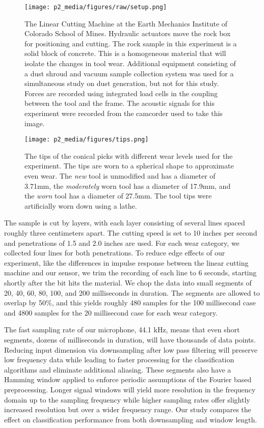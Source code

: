 \begin{figure}[t!]
\centering
\texttt{[image: p2\_media/figures/raw/setup.png]}
\caption{The Linear Cutting Machine at the Earth Mechanics Institute of Colorado School of Mines.
Hydraulic actuators move the rock box for positioning and cutting. The rock sample in this experiment
is a solid block of concrete. This is a homogeneous material that will isolate the changes in tool wear.
Additional equipment consisting of a dust shroud and vacuum sample collection system was used for a
 simultaneous study on dust generation, but not for this study.
Forces are recorded using integrated load cells in the coupling between the tool and the frame.
The acoustic signals for this experiment were recorded from the camcorder used to take this image.
}
\label{fig:setup}
\end{figure}

\begin{figure}[t!]
\centering
\texttt{[image: p2\_media/figures/tips.png]}
\caption{The tips of the conical picks with different wear levels used for the experiment.
The tips are worn to a spherical shape to approximate even wear. The \textit{new} tool is unmodified
and has a diameter of 3.71mm, the \textit{moderately} worn tool has a diameter of 17.9mm,
 and the \textit{worn} tool has a diameter of 27.5mm. The tool tips were artificially worn down using a lathe.}
\label{fig:levels}
\end{figure}

The sample is cut by layers, with each layer consisting of several lines spaced roughly three centimeters apart.
The cutting speed is set to 10 inches per second and penetrations of 1.5 and 2.0 inches are used.
For each wear category, we collected four lines for both penetrations. 
To reduce edge effects of our experiment, 
like the differences in impulse response
between the linear cutting machine and our sensor,
we trim the recording of each line to 6 seconds,
starting shortly after the bit hits the material. 
We chop the data into small segments of 20, 40, 60, 80, 100, and 200 milliseconds in duration.
The segments are allowed to overlap by 50\%, and
this yields roughly 480 samples for the 100 millisecond case and 
4800 samples for the 20 millisecond case for each wear category.

The fast sampling rate of our microphone, 44.1 kHz, means that even short segments,
dozens of milliseconds in duration, will have thousands of data points.
Reducing input dimension via downsampling after low pass filtering will preserve 
low frequency data while leading to faster processing for the classification algorithms and 
eliminate additional aliasing.
These segments also have a Hamming window applied to enforce periodic assumptions of the Fourier based preprocessing.
Longer signal windows will yield more resolution in the frequency domain up to the sampling frequency
while higher sampling rates offer slightly increased resolution but over a wider frequency range.
Our study compares the effect on classification performance from both downsampling and window length.

